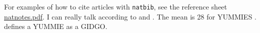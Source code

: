 \documentclass{article}\usepackage[]{graphicx}\usepackage[]{color}
\begin{document}
For examples of how to cite articles with \texttt{natbib}, see the reference sheet
\href{http://ftp.math.purdue.edu/mirrors/ctan.org/macros/latex/contrib/natbib/natnotes.pdf}{natnotes.pdf}.
I can really talk according to \citet{beck2014} and \citet{dean2014}.
The mean is 28 for YUMMIES \citep{murp2012}. \citet{rich2013} defines a YUMMIE as a GIDGO.

\nocite{*}

\end{document}
